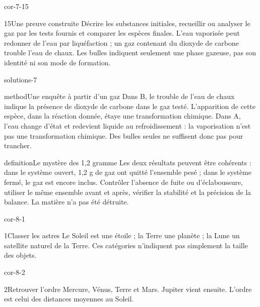 \documentclass[12pt,twoside,openany]{book}
\begin{document}
\begin{blocLivre}{cor-7-15}
\begin{corrige}{15}{Une preuve construite}
Décrire les substances initiales, recueillir ou analyser le gaz par les tests fournis et comparer les espèces finales. L’eau vaporisée peut redonner de l’eau par liquéfaction ; un gaz contenant du dioxyde de carbone trouble l’eau de chaux. Les bulles indiquent seulement une phase gazeuse, pas son identité ni son mode de formation.\par
\end{corrige}\end{blocLivre}
\label{solutions-7}
\begin{pcFiche}{solutions-7}
\begin{pcEncadre}{method}{Une enquête à partir d’un gaz}
Dans B, le trouble de l’eau de chaux indique la présence de dioxyde de carbone dans le gaz testé. L’apparition de cette espèce, dans la réaction donnée, étaye une transformation chimique. Dans A, l’eau change d’état et redevient liquide au refroidissement : la vaporisation n’est pas une transformation chimique. Des bulles seules ne suffisent donc pas pour trancher.\par
\end{pcEncadre}
\label{defi-cor-7}
\begin{pcEncadre}{definition}{Le mystère des 1,2 gramme}
Les deux résultats peuvent être cohérents : dans le système ouvert, 1,2 g de gaz ont quitté l’ensemble pesé ; dans le système fermé, le gaz est encore inclus. Contrôler l’absence de fuite ou d’éclaboussure, utiliser le même ensemble avant et après, vérifier la stabilité et la précision de la balance. La matière n’a pas été détruite.\par
\end{pcEncadre}
\end{pcFiche}
\clearpage{}
\begin{blocLivre}{cor-8-1}
\begin{corrige}{1}{Classer les astres}
Le Soleil est une étoile ; la Terre une planète ; la Lune un satellite naturel de la Terre. Ces catégories n’indiquent pas simplement la taille des objets.\par
\end{corrige}\end{blocLivre}
\begin{blocLivre}{cor-8-2}
\begin{corrige}{2}{Retrouver l’ordre}
Mercure, Vénus, Terre et Mars. Jupiter vient ensuite. L’ordre est celui des distances moyennes au Soleil.\par
\end{corrige}\end{blocLivre}
\end{document}
